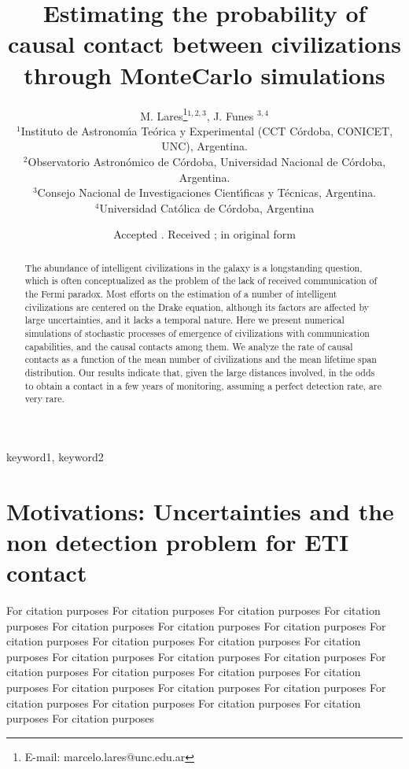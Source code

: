 \documentclass[useAMS,usenatbib]{mnras}
\title{Estimating the probability of causal contact between
civilizations through MonteCarlo simulations}
\author[M. Lares et al.]
{M. Lares\thanks{E-mail: marcelo.lares@unc.edu.ar}\footnotemark[0] $^{1,2,3}$,
J. Funes $^{3, 4}$
\\
$^{1}$Instituto de Astronom\'{\i}a Te\'orica y Experimental (CCT C\'ordoba, CONICET, UNC), Argentina.\\
$^{2}$Observatorio Astron\'omico de C\'ordoba, Universidad Nacional de C\'ordoba, Argentina.\\
$^{3}$Consejo Nacional de Investigaciones Cient\'{\i}ficas y
T\'ecnicas, Argentina.\\
$^{4}$Universidad Católica de Córdoba, Argentina
}
\begin{document}
\date{Accepted . Received ; in original form }


 \maketitle

\label{firstpage}

\begin{abstract}
%
The abundance of intelligent civilizations in the galaxy is a
longstanding question, which is often conceptualized as the problem
of the lack of received communication of the Fermi paradox.
%
Most efforts on the estimation of a number of intelligent
civilizations are centered on the Drake equation, although 
its factors are affected by large uncertainties, and it lacks a
temporal nature.
%
Here we present numerical simulations of stochastic processes of
emergence of civilizations with communication capabilities, and
the causal contacts among them.
%
We analyze the rate of causal contacts as a function of the mean
number of civilizations and the mean lifetime span distribution.
%
Our results indicate that, given the large distances involved, in
   the odds to obtain a contact in a few years of monitoring, assuming a
   perfect detection rate, are very rare.
\end{abstract}
%
\begin{keywords}
keyword1, keyword2
\end{keywords}
%


\section{Motivations: Uncertainties and the non detection problem for
ETI contact}

For citation purposes \citep{Lineweaver2004}
For citation purposes \citep{Forgan2011}
For citation purposes \citep{Rahvar2016}
For citation purposes \citep{Glade2011}
For citation purposes \citep{Dayal2016}
For citation purposes \citep{Gobat2016}
For citation purposes \citep{Prantzos2013}
For citation purposes \citep{Horvat2007}
For citation purposes \citep{Starling2013}
For citation purposes \citep{Barlow2012}
For citation purposes \citep{Tarter2009}
For citation purposes \citep{Forgan2017}
For citation purposes \citep{Forgan2013}
For citation purposes \citep{Wright2015}
For citation purposes \citep{Loeb2006}
For citation purposes \citep{Solomonides2016}
For citation purposes \citep{Fogg1987}
For citation purposes \citep{Anchordoqui2017}
For citation purposes \citep{Balb2018}
For citation purposes \citep{Forgan2010}
For citation purposes \citep{Forgan2008}
For citation purposes \citep{Forgan2016}
For citation purposes \citep{Haqq-Misra2017}
For citation purposes \citep{Forgan2015}
For citation purposes \citep{Gleiser2010}
For citation purposes \citep{cirkovic_temporal_2004}
\end{document}
